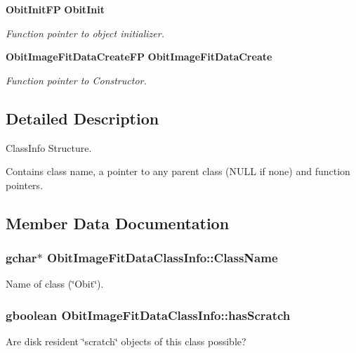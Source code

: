 \begin{CompactItemize}
{\bf Obit\-Init\-FP} {\bf Obit\-Init}
\begin{CompactList}\small\item\em Function pointer to object initializer. \item\end{CompactList}\item 
{\bf Obit\-Image\-Fit\-Data\-Create\-FP} {\bf Obit\-Image\-Fit\-Data\-Create}
\begin{CompactList}\small\item\em Function pointer to Constructor. \item\end{CompactList}\end{CompactItemize}


\subsection{Detailed Description}
Class\-Info Structure. 

Contains class name, a pointer to any parent class (NULL if none) and function pointers. 



\subsection{Member Data Documentation}
\subsubsection{\setlength{\rightskip}{0pt plus 5cm}gchar$\ast$ {\bf Obit\-Image\-Fit\-Data\-Class\-Info::Class\-Name}}\label{structObitImageFitDataClassInfo_o2}


Name of class (\char`\"{}Obit\char`\"{}). 

\subsubsection{\setlength{\rightskip}{0pt plus 5cm}gboolean {\bf Obit\-Image\-Fit\-Data\-Class\-Info::has\-Scratch}}\label{structObitImageFitDataClassInfo_o1}


Are disk resident \char`\"{}scratch\char`\"{} objects of this class possible? 

